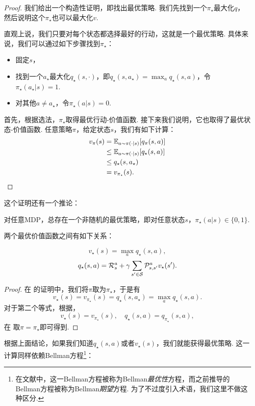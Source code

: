 \begin{proof}
我们给出一个构造性证明，即找出最优策略. 我们先找到一个$\pi_\star$最大化$q$，然后说明这个$\pi_\star$也可以最大化$v$. 

直观上说，我们只要对每个状态都选择最好的行动，这就是一个最优策略. 具体来说，我们可以通过如下步骤找到$\pi_\star$：
\begin{itemize}
    \item 固定$s$，
    \item 找到一个$a_\star$最大化$q_\star(s,\cdot)$，即$q_\star(s,a_\star)=\max_{a}q_\star(s,a)$，令$\pi_\star(a_\star|s)=1$.
    \item 对其他$a\neq a_\star$，令$\pi_\star(a|s)=0$.
\end{itemize}
首先，根据选法，$\pi_\star$取得最优行动-价值函数. 接下来我们说明，它也取得了最优状态-价值函数. 任意策略$\pi$，给定状态$s$，我们有如下计算：
\begin{align*}
    v_\pi(s) &= \mathbb{E}_{a\sim\pi(\cdot|s)}[q_\pi(s,a)]\\
             &\leq \mathbb{E}_{a\sim\pi(\cdot|s)}[q_\star(s,a)]\\
             &\leq q_\star(s,a_\star)\\
             &=v_{\pi_\star}(s).
\end{align*}
\end{proof}
这个证明还有一个推论：
\begin{corollary}
    对任意MDP，总存在一个非随机的最优策略，即对任意状态$s$，$\pi_\star(a|s)\in\{0,1\}$.
\end{corollary}

两个最优价值函数之间有如下关系：
\begin{proposition}\label{prop:state-action-value-optimal}
\[v_\star(s) = \max_a q_\star(s,a),\]
\[q_\star(s,a) = \mathcal R_s^a + \gamma \sum_{s'\in \mathcal S}\mathcal P_{s,s'}^av_\star(s').\]
\end{proposition}
\begin{proof}
    在 的证明中，我们将$\pi$取为$\pi_\star$，于是有
    \[v_\star(s) = v_{\pi_\star}(s) = q_{\star}(s,a_\star) = \max_a q_\star(s,a).\]
    对于第二个等式，根据，
    \[v_\star(s) = v_{\pi_\star}(s),\quad q_\star(s,a) = q_{\pi_\star}(s,a),\]
    在 取$\pi=\pi_\star$即可得到.
\end{proof}

根据上面结论，如果我们知道$q_\star(s,a)$或者$v_\star(s)$，我们就能获得最优策略. 这一计算同样依赖Bellman方程\footnote{在文献中，这一Bellman方程被称为Bellman\emph{最优性}方程，而之前推导的Bellman方程被称为Bellman\emph{期望}方程. 为了不过度引入术语，我们这里不做这种区分. }：

